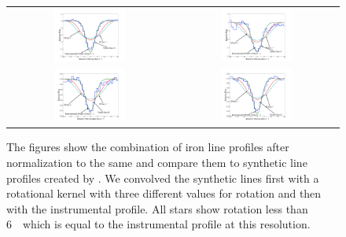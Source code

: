 \begin{figure}[tb]
\begin{tabular}{cc}
\includegraphics[width=0.45\textwidth, trim=130 30 60 0]{chapter_sn1572_hires/plots/stara_rotation.pdf} &
\includegraphics[width=0.45\textwidth, trim=130 30 60 0]{chapter_sn1572_hires/plots/starc_rotation.pdf} \\
\includegraphics[width=0.45\textwidth, trim=130 30 60 0]{chapter_sn1572_hires/plots/stare_rotation.pdf} &
\includegraphics[width=0.45\textwidth, trim=130 30 60 0]{chapter_sn1572_hires/plots/starg_rotation.pdf} \\
\end{tabular}
\caption[Rotation measurement for all candidate stars in SN 1572]{The figures show the combination of iron line profiles after normalization to the same  and compare them to synthetic line profiles created by . We convolved the synthetic lines first with a rotational kernel with three different values for rotation and then with the instrumental profile. All stars show rotation less than 6~\kms\ which is equal to the instrumental profile at this resolution. }
\label{fig:sn1572_hires:rotvel}
\end{figure}

